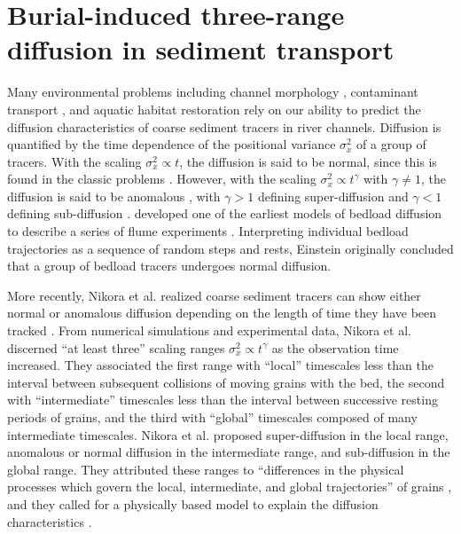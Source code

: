 
\chapter{Burial-induced three-range diffusion in sediment transport}
\label{ch:downDiff}

Many environmental problems including channel morphology \citep{Hassan2017}, contaminant transport \citep{Macklin2006}, and aquatic habitat restoration \citep{Gaeuman2017} rely on our ability to predict the diffusion characteristics of coarse sediment tracers in river channels.
Diffusion is quantified by the time dependence of the positional variance $\sigma_x^2$ of a group of tracers.
With the scaling $\sigma_x^2 \propto t$, the diffusion is said to be normal, since this is found in the classic problems \DIFdelbegin {}\DIFdelend \DIFaddbegin {}\DIFaddend .
However, with the scaling $\sigma_x^2 \propto t^\gamma$ with $\gamma \neq 1$, the diffusion is said to be anomalous \citep{Sokolov2012}, with $\gamma>1$ defining super-diffusion and $\gamma<1$ defining sub-diffusion \citep{Metzler2000}.
\citet{Einstein1937} developed one of the earliest models of bedload diffusion to describe a series of flume experiments \citep{Ettema2004}.
Interpreting individual bedload trajectories as a sequence of random steps and rests, Einstein originally concluded that a group of bedload tracers undergoes normal diffusion.

More recently, Nikora et al. realized coarse sediment tracers can show either normal or anomalous diffusion depending on the length of time they have been tracked \citep{Nikora2001a,Nikora2002}.
From numerical simulations and experimental data, Nikora et al. discerned ``at least three'' scaling ranges $\sigma_x^2 \propto t^\gamma$ as the observation time increased.
They associated the first range with ``local'' timescales less than the interval between subsequent collisions of moving grains with the bed, the second with ``intermediate'' timescales less than the interval between successive resting periods of grains, and the third with ``global'' timescales composed of many intermediate timescales.
Nikora et al. proposed super-diffusion in the local range, anomalous or normal diffusion in the intermediate range, and sub-diffusion in the global range.
They attributed these ranges to ``differences in the physical processes which govern the local, intermediate, and global trajectories'' of grains \citep{Nikora2001a}, and they called for a physically based model to explain the diffusion characteristics \citep{Nikora2002}.

